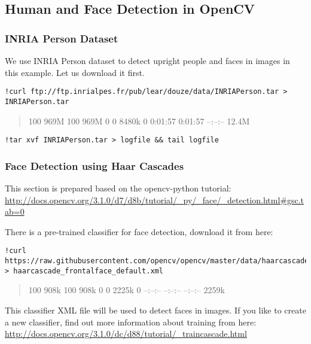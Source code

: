 \subsection{Human and Face Detection in
OpenCV}\label{human-and-face-detection-in-opencv}

\subsubsection{INRIA Person Dataset}\label{inria-person-dataset-1}

We use INRIA Person dataset to detect upright people and faces in images
in this example. Let us download it first.

\begin{lstlisting}
!curl ftp://ftp.inrialpes.fr/pub/lear/douze/data/INRIAPerson.tar > INRIAPerson.tar
\end{lstlisting}

\begin{quote}
100 969M 100 969M 0 0 8480k 0 0:01:57 0:01:57 --:--:-- 12.4M
\end{quote}

\begin{lstlisting}
!tar xvf INRIAPerson.tar > logfile && tail logfile
\end{lstlisting}

\subsubsection{Face Detection using Haar
Cascades}\label{face-detection-using-haar-cascades}

This section is prepared based on the opencv-python tutorial:
\url{http://docs.opencv.org/3.1.0/d7/d8b/tutorial/_py/_face/_detection.html\#gsc.tab=0}

There is a pre-trained classifier for face detection, download it from
here:

\begin{lstlisting}
!curl https://raw.githubusercontent.com/opencv/opencv/master/data/haarcascades/haarcascade_frontalface_default.xml > haarcascade_frontalface_default.xml
\end{lstlisting}

\begin{quote}
100 908k 100 908k 0 0 2225k 0 --:--:-- --:--:-- --:--:-- 2259k
\end{quote}

This classifier XML file will be used to detect faces in images. If you
like to create a new classifier, find out more information about
training from here:
\url{http://docs.opencv.org/3.1.0/dc/d88/tutorial/_traincascade.html}

